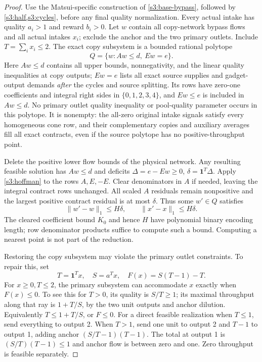 \begin{proof}
Use the Matsui-specific construction of \cref{s3:base-bypass}, followed
by \cref{s3:half,s3:cycles}, before any final quality normalization.
Every actual intake has quality $a_i>1$ and reward $b_i>0$. Let $w$
contain all copy-network bypass flows and all actual intakes $x_i$;
exclude the anchor and the two primary outlets. Include
$T=\sum_i x_i\le2$. The exact copy subsystem is a bounded rational
polytope
\[
 Q=\{w:Aw\le d,\ Ew=e\}.
\]
Here $Aw\le d$ contains all upper bounds, nonnegativity, and the
linear quality inequalities at copy outputs; $Ew=e$ lists all exact
source supplies and gadget-output demands \emph{after} the cycles and
source splitting. Its rows have zero-one coefficients and integral
right sides in $\{0,1,2,3,4\}$, and $Ew\le e$ is included in $Aw\le d$.
No primary outlet quality inequality or pool-quality parameter occurs
in this polytope. It is nonempty: the all-zero original intake signals
satisfy every homogeneous cone row, and their complementary copies and
auxiliary averages fill all exact contracts, even if the source polytope
has no positive-throughput point.

Delete the positive lower flow bounds of the physical network. Any
resulting feasible solution has $Aw\le d$ and deficits
$\Delta=e-Ew\ge0$, $\delta=\mathbf1^T\Delta$.
Apply \cref{s3:hoffman} to the rows $A,E,-E$. Clear denominators in
$A$ if needed, leaving the integral contract rows unchanged. All scaled
$A$ residuals remain nonpositive and the largest positive contract
residual is at most $\delta$. Thus some $w'\in Q$ satisfies
\begin{equation}
 \|w'-w\|_1\le H\delta,
 \qquad \|x'-x\|_1\le H\delta.\label{s3:restore-copy}
\end{equation}
The cleared coefficient bound $K_0$ and hence $H$ have polynomial
binary encoding length; row denominator products suffice to compute
such a bound. Computing a nearest point is not part of the reduction.

Restoring the copy subsystem may violate the primary outlet constraints.
To repair this, set
\[
 T=\mathbf1^Tx,\quad S=a^Tx,\quad F(x)=S(T-1)-T.
\]
For $x\ge0,T\le2$, the primary subsystem can accommodate $x$ exactly
when $F(x)\le0$. To see this for $T>0$, its quality is $S/T\ge1$;
its maximal throughput along that ray is $1+T/S$, by the two unit
outputs and anchor dilution. Equivalently $T\le1+T/S$, or $F\le0$.
For a direct feasible realization when $T\le1$, send everything to
output 2. When $T>1$, send one unit to output 2 and $T-1$ to output 1,
adding anchor $(S/T-1)(T-1)$. The total at output 1 is
$(S/T)(T-1)\le1$ and anchor flow is between zero and one.
Zero throughput is feasible separately.


\end{proof}
